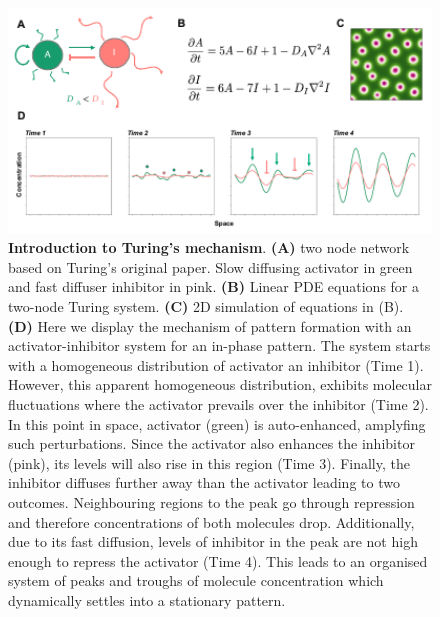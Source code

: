 \begin{figure}[h!]
    \centering
    \includegraphics[width=1\textwidth]{chapters/Introduction/intro_to_Turing_patterns}
    \caption[\textbf{Introduction to Turing's mechanism of pattern formation}]{\textbf{Introduction to Turing's mechanism}. \textbf{(A)} two node network based on Turing's original paper. Slow diffusing activator in green and fast diffuser inhibitor in pink. \textbf{(B)} Linear PDE equations for a two-node Turing system. \textbf{(C)} 2D simulation of equations in (B). \textbf{(D)} Here we display the mechanism of pattern formation with an activator-inhibitor system for an in-phase pattern. The system starts with a homogeneous distribution of activator an inhibitor (Time 1). However, this apparent homogeneous distribution, exhibits molecular fluctuations where the activator prevails over the inhibitor (Time 2). In this point in space, activator (green) is auto-enhanced, amplyfing such perturbations. Since the activator also enhances the inhibitor (pink), its levels will also rise in this region (Time 3). Finally, the inhibitor diffuses further away than the activator leading to two outcomes. Neighbouring regions to the peak go through repression and therefore concentrations of both molecules drop. Additionally, due to its fast diffusion, levels of inhibitor in the peak are not high enough to repress the activator  (Time 4). This leads to an organised system of peaks and troughs of molecule concentration which dynamically settles into a stationary pattern.}
    \label{fig:intro_to_Turing_patterns}
\end{figure}


